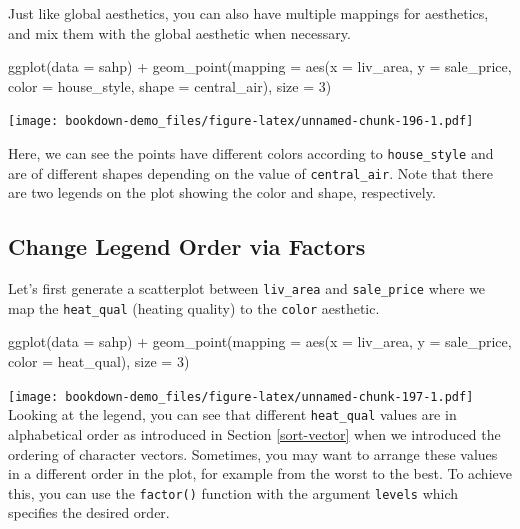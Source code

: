 \documentclass[
]{book}
\newenvironment{Shaded}{\begin{snugshade}}{\end{snugshade}}
\newcommand{\AttributeTok}[1]{\textcolor[rgb]{0.77,0.63,0.00}{#1}}
\newcommand{\DecValTok}[1]{\textcolor[rgb]{0.00,0.00,0.81}{#1}}
\newcommand{\FunctionTok}[1]{\textcolor[rgb]{0.00,0.00,0.00}{#1}}
\newcommand{\NormalTok}[1]{#1}
\newcommand{\SpecialCharTok}[1]{\textcolor[rgb]{0.00,0.00,0.00}{#1}}
\begin{document}
Just like global aesthetics, you can also have multiple mappings for aesthetics, and mix them with the global aesthetic when necessary.

\begin{Shaded}
\begin{Highlighting}[]
\FunctionTok{ggplot}\NormalTok{(}\AttributeTok{data =}\NormalTok{ sahp) }\SpecialCharTok{+} \FunctionTok{geom\_point}\NormalTok{(}\AttributeTok{mapping =} \FunctionTok{aes}\NormalTok{(}\AttributeTok{x =}\NormalTok{ liv\_area, }\AttributeTok{y =}\NormalTok{ sale\_price, }\AttributeTok{color =}\NormalTok{ house\_style, }\AttributeTok{shape =}\NormalTok{ central\_air), }\AttributeTok{size =} \DecValTok{3}\NormalTok{)}
\end{Highlighting}
\end{Shaded}

\texttt{[image: bookdown-demo\_files/figure-latex/unnamed-chunk-196-1.pdf]}

Here, we can see the points have different colors according to \texttt{house\_style} and are of different shapes depending on the value of \texttt{central\_air}. Note that there are two legends on the plot showing the color and shape, respectively.

\hypertarget{change-legend-order-via-factors}{%
\subsection{Change Legend Order via Factors}\label{change-legend-order-via-factors}}

Let's first generate a scatterplot between \texttt{liv\_area} and \texttt{sale\_price} where we map the \texttt{heat\_qual} (heating quality) to the \texttt{color} aesthetic.

\begin{Shaded}
\begin{Highlighting}[]
\FunctionTok{ggplot}\NormalTok{(}\AttributeTok{data =}\NormalTok{ sahp) }\SpecialCharTok{+} \FunctionTok{geom\_point}\NormalTok{(}\AttributeTok{mapping =} \FunctionTok{aes}\NormalTok{(}\AttributeTok{x =}\NormalTok{ liv\_area, }\AttributeTok{y =}\NormalTok{ sale\_price, }\AttributeTok{color =}\NormalTok{ heat\_qual), }\AttributeTok{size =} \DecValTok{3}\NormalTok{)}
\end{Highlighting}
\end{Shaded}

\texttt{[image: bookdown-demo\_files/figure-latex/unnamed-chunk-197-1.pdf]}
Looking at the legend, you can see that different \texttt{heat\_qual} values are in alphabetical order as introduced in Section \ref{sort-vector} when we introduced the ordering of character vectors. Sometimes, you may want to arrange these values in a different order in the plot, for example from the worst to the best. To achieve this, you can use the \texttt{factor()} function with the argument \texttt{levels} which specifies the desired order.
\end{document}

